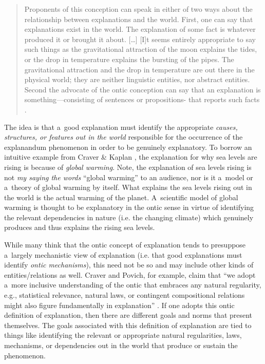 \begin{quotation}
Proponents of this conception can speak in either of two ways about the relationship between explanations and the world. First, one can say that explanations exist in the world. The explanation of some fact is whatever produced it or brought it about. […] [I]t seems entirely appropriate to say such things as the gravitational attraction of the moon explains the tides, or the drop in temperature explains the bursting of the pipes. The gravitational attraction and the drop in temperature are out there in the physical world; they are neither linguistic entities, nor abstract entities. Second the advocate of the ontic conception can say that an explanation is something---consisting of sentences or propositions- that reports such facts
\parencite[][p.86]{salmon_four_1989}.%


\end{quotation}
The idea is that a~good explanation must identify the appropriate \textit{causes, structures, or features out in the world} responsible for the occurrence of the explanandum phenomenon in order to be genuinely explanatory. To borrow an intuitive example from Craver \& Kaplan
\parencite*[][pp.299–300]{craver_are_2020}, %
 the explanation for why sea levels are rising is because of \textit{global warming}. Note, the explanation of sea levels rising is not \textit{my saying the words} ``global warming'' to an audience, nor is it a~model or a~theory of global warming by itself. What explains the sea levels rising out in the world is the actual warming of the planet. A~scientific model of global warming is thought to be explanatory in the ontic sense in virtue of identifying the relevant dependencies in nature (i.e. the changing climate) which genuinely produces and thus explains the rising sea levels.

While many think that the ontic concept of explanation tends to presuppose a~largely mechanistic view of explanation (i.e. that good explanations must identify \textit{ontic mechanisms}), this need not be so and may include other kinds of entities/relations as well. Craver and Povich, for example, claim that ``we adopt a~more inclusive understanding of the ontic that embraces any natural regularity, e.g., statistical relevance, natural laws, or contingent compositional relations might also figure fundamentally in explanation''
\parencites[][p.32]{craver_directionality_2017}[see also:][]{povich_because_2018}. %
 If one adopts this ontic definition of explanation, then there are different goals and norms that present themselves. The goals associated with this definition of explanation are tied to things like identifying the relevant or appropriate natural regularities, laws, mechanisms, or dependencies out in the world that produce or sustain the phenomenon.

